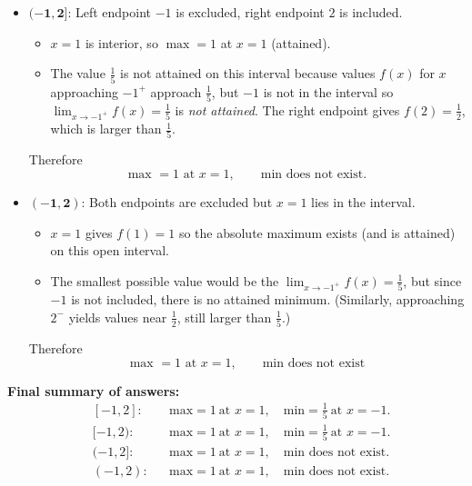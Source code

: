 \documentclass[10pt]{article}
\begin{document}
{\begin{itemize}
  \item \(\mathbf{(-1,2]}\): Left endpoint \(-1\) is excluded, right endpoint \(2\) is included.
    \begin{itemize}
      \item \(x=1\) is interior, so \(\max=1\) at \(x=1\) (attained).
      \item The value \(\tfrac{1}{5}\) is not attained on this interval because values \(f(x)\) for \(x\) approaching \(-1^+\) approach \(\tfrac{1}{5}\), but \(-1\) is not in the interval so $\displaystyle\lim_{x\to -1^{+}}f(x) = \frac{1}{5}$ is \emph{not attained}. The right endpoint gives \(f(2)=\tfrac{1}{2}\), which is larger than \(\tfrac{1}{5}\).
    \end{itemize}
    Therefore
    \[
    \boxed{\text{max } = 1 \text{ at } x=1,\qquad \text{min does not exist.}}
    \]

  \item \(\mathbf{(-1,2)}\): Both endpoints are excluded but \(x=1\) lies in the interval.
    \begin{itemize}
      \item \(x=1\) gives \(f(1)=1\) so the absolute maximum exists (and is attained) on this open interval.
      \item The smallest possible value would be the $\displaystyle\lim_{x\to -1^{+}}f(x) = \frac{1}{5}$, but since \(-1\) is not included, there is no attained minimum. (Similarly, approaching \(2^-\) yields values near \(\tfrac{1}{2}\), still larger than \(\tfrac{1}{5}\).)
    \end{itemize}
    Therefore
    \[
    \boxed{\text{max } = 1 \text{ at } x=1,\qquad \text{min does not exist}}
    \]
\end{itemize}

\medskip

\textbf{Final summary of answers:}
\[
\begin{aligned}
&[-1,2]: &&\text{max}=1\ \text{at }x=1,\quad \text{min}=\tfrac{1}{5}\ \text{at }x=-1.\\
&[-1,2): &&\text{max}=1\ \text{at }x=1,\quad \text{min}=\tfrac{1}{5}\ \text{at }x=-1.\\
&(-1,2]: &&\text{max}=1\ \text{at }x=1,\quad \text{min does not exist}.\\
&(-1,2): &&\text{max}=1\ \text{at }x=1,\quad \text{min does not exist}.
\end{aligned}
\]
}



\newpage%
\end{document}
